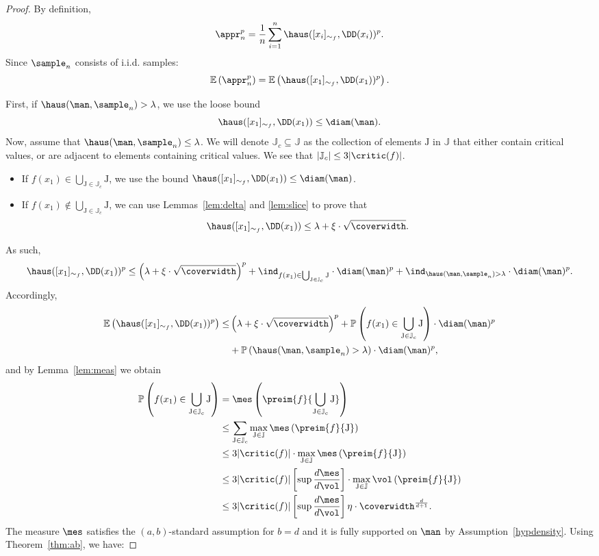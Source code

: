 \begin{proof}
By definition,
$$\appr_n^p=\frac{1}{n}\sum_{i=1}^n\haus([x_i]_{\sim_f},\DD(x_i))^p.$$
Since $\sample_n$ consists of i.i.d. samples:
$$\mathbb{E}\left(\appr_n^p\right)=\mathbb{E}\left(\haus([x_1]_{\sim_f},\DD(x_1))^p\right).$$


First, if $\haus(\man,\sample_n)>\lambda$, we use the loose bound $$\haus([x_1]_{\sim_f},\DD(x_1))\leq\diam(\man).$$
Now, assume that $\haus(\man,\sample_n)\leq\lambda$.
We will denote $\mathbb{J}_c\subseteq\mathbb{J}$ as the collection of elements $\mathrm{J}$ in $\mathbb{J}$ that either contain critical values, or are adjacent to elements containing critical values. We see that $|\mathbb{J}_c|\leq 3|\critic(f)|$.

\begin{itemize}
	\item If $f(x_1)\in \bigcup_{\mathrm{J}\in  \mathbb{J}_c} \mathrm{J} $, we use the bound $\haus([x_1]_{\sim_f},\DD(x_1))\leq\diam(\man)$.
    \item If $f(x_1) \notin \bigcup_{\mathrm{J}\in  \mathbb{J}_c} \mathrm{J}  $, we can use Lemmas~\ref{lem:delta} and \ref{lem:slice} to prove that
    $$\haus([x_1]_{\sim_f},\DD(x_1))\leq\lambda+\xi\cdot\sqrt{\coverwidth}.$$
\end{itemize}


As such,
$$\haus([x_1]_{\sim_f},\DD(x_1))^p\leq
\left(\lambda+\xi\cdot\sqrt{\coverwidth}\right)^p+
\ind_{f(x_1) \in \bigcup_{\mathrm{J}\in  \mathbb{J}_c} \mathrm{J} }\cdot \diam(\man)^p+\ind_{\haus(\man,\sample_n)>\lambda}\cdot \diam(\man)^p.$$
Accordingly,
\begin{align*}
    \mathbb{E}\left(\haus([x_1]_{\sim_f},\DD(x_1))^p\right)\leq&
    \left(\lambda+\xi\cdot\sqrt{\coverwidth}\right)^p+
    \mathbb{P}\left(f(x_1) \in \bigcup_{\mathrm{J}\in  \mathbb{J}_c} \mathrm{J} \right)\cdot \diam(\man)^p\\
    &+\mathbb{P}\left(\haus(\man,\sample_n)>\lambda\right)\cdot \diam(\man)^p,
\end{align*}
and by Lemma~\ref{lem:meas} we obtain
\begin{align*}
    \mathbb{P}\left(f(x_1) \in \bigcup_{\mathrm{J}\in  \mathbb{J}_c} \mathrm{J}  \right)&=\mes\left( \preim{f}{\bigcup_{\mathrm{J}\in\mathbb{J}_c}\mathrm{J}}\right)\\
    &\leq \sum_{\mathrm{J}\in\mathbb{J}_c} \max_{\mathrm{J}\in\mathbb{J}}\mes\left( \preim{f}{\mathrm{J}}\right)\\
    &\leq 3|\critic(f)|\cdot\max_{\mathrm{J}\in\mathbb{J}}\mes\left(\preim{f}{\mathrm{J}}\right)\\
    &\leq 3|\critic(f)|\left[\sup\frac{d\mes}{d\vol}\right]\cdot\max_{\mathrm{J}\in\mathbb{J}}\vol\left(\preim{f}{\mathrm{J}}\right)\\
    &\leq 3|\critic(f)|\left[\sup\frac{d\mes}{d\vol}\right]\eta\cdot\coverwidth^{\frac{d}{d+1}}.
\end{align*}
The measure $\mes$ satisfies the $(a,b)$-standard assumption for $b=d$ and it is fully supported on $\man$ by Assumption~\ref{hypdensity}. Using Theorem~\ref{thm:ab}, we have:


\end{proof}
